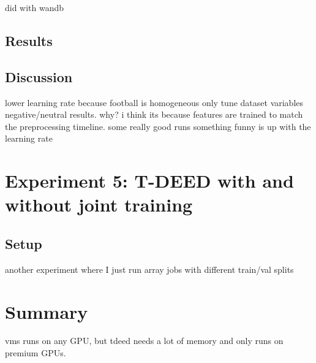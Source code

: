 did with wandb
\subsection{Results}
\label{ssec:ex4_results}



\subsection{Discussion}
\label{ssec:ex4_discussion}
lower learning rate because football is homogeneous
only tune dataset variables
negative/neutral results. why? i think its because features are trained to match the preprocessing timeline. some really good runs
something funny is up with the learning rate



\section{Experiment 5: T-DEED with and without joint training}
\subsection{Setup}
\label{ssec:ex5_setup}

another experiment where I just run array jobs with different train/val splits

\section{Summary}
vms runs on any GPU, but tdeed needs a lot of memory and only runs on premium GPUs.